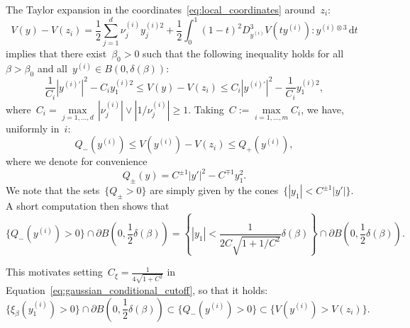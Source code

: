 \documentclass[10pt]{article}
\renewcommand{\d}{\mathrm{d}}
\newcommand{\1}{\mathbbm 1}
\newcommand{\largeRadius}{\delta}
\newcommand{\hessEigval}[2]{\nu^{(#1)}_{#2}} %
\newcommand{\gaussianCutoffConst}{C_\xi}
\begin{document}
            The Taylor expansion in the coordinates~\eqref{eq:local_coordinates} around~$z_i$:
                \begin{equation}
                    V(y) - V(z_i) = \frac12\sum_{j=1}^d \hessEigval{i}{j}y^{(i)2}_j + \frac12 \int_0^1 (1-t)^2 D_{y^{(i)}}^3 V\left(ty^{(i)}\right):y^{(i)\otimes 3}\,\d t
                \end{equation}
                implies that there exist~$\beta_0>0$ such that the following inequality holds for all~$\beta>\beta_0$ and all~$y^{(i)}\in B\left(0,\delta(\beta)\right)$:
                \[\frac1{C_i} |y^{(i)\prime}|^2 - C_i y^{(i)2}_1\leq V(y) - V(z_i)\leq C_i|y^{(i)\prime}|^2 - \frac1{C_i} y^{(i)2}_1,\]
                where~$C_i = \underset{j=1,\dots,d}{\max}\,|\hessEigval{i}{j}|\lor |1/\hessEigval{i}{j}|\geq 1$.
                Taking~$C := \underset{i=1,\dots,m}{\max}C_i$, we have, uniformly in~$i$:
                \begin{equation}
                    \label{eq:quadratic_estimate}
                    Q_{-}(y^{(i)}) \leq V(y^{(i)})-V(z_i) \leq Q_{+}(y^{(i)}),
                \end{equation}
                where we denote for convenience
                \begin{equation}
                    \label{eq:quadratic_forms}
                    Q_{\pm}(y) = C^{\pm 1}|y'|^2 - C^{\mp 1}y_1^2.
                \end{equation}
                We note that the sets~$\{Q_{\pm}>0\}$ are simply given by the cones~$\{|y_1| <  C^{\pm 1}|y'|\}$.
                A short computation then shows that
                $$\{Q_{-}(y^{(i)})>0\} \cap \partial B\left(0,\frac12\largeRadius(\beta)\right) = \left\{|y_1| < \frac1{2C\sqrt{1+1/C^2}}\largeRadius(\beta)\right\}\cap \partial B\left(0,\frac12\delta(\beta)\right).$$

                This motivates setting~$\gaussianCutoffConst = \frac1{4\sqrt{1+C^2}}$ in Equation~\eqref{eq:gaussian_conditional_cutoff}, so that it holds:
                \[\{\xi_\beta(y_1^{(i)})>0\} \cap \partial B\left(0,\frac12\largeRadius(\beta)\right)\subset \{Q_-(y^{(i)})>0\} \subset \{V(y^{(i)})>V(z_i)\}.\]
\end{document}
